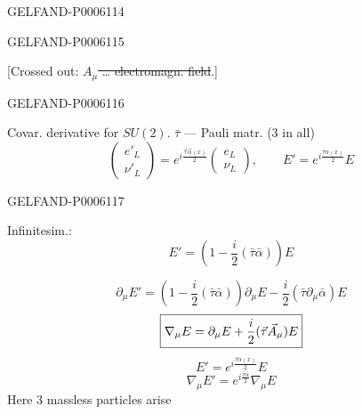 \begin{GelfandAdjacentEvidence}{GELFAND-P000611}{4}



\end{GelfandAdjacentEvidence}
\begin{GelfandAdjacentEvidence}{GELFAND-P000611}{5}


[Crossed out: \sout{\(A_\mu\) … electromagn. field}.]
\end{GelfandAdjacentEvidence}
\begin{GelfandAdjacentEvidence}{GELFAND-P000611}{6}


Covar. derivative for \(SU(2)\).
\qquad \(\bar\tau\) — Pauli matr. (3 in all)
\[
\begin{pmatrix}e'_L\\\nu'_L\end{pmatrix}
=e^{i\frac{\vec\tau\vec\alpha(x)}2}
\begin{pmatrix}e_L\\\nu_L\end{pmatrix},
\qquad E'=e^{i\frac{\bar\tau\bar\alpha(x)}2}E
\]
\end{GelfandAdjacentEvidence}
\begin{GelfandAdjacentEvidence}{GELFAND-P000611}{7}

Infinitesim.:
\[
E'=\left(1-\frac i2(\bar\tau\bar\alpha)\right)E
\]
\end{GelfandAdjacentEvidence}

\[
\partial_\mu E'=
\left(1-\frac i2(\bar\tau\bar\alpha)\right)\partial_\mu E
-\frac i2(\bar\tau\partial_\mu\bar\alpha)E
\]
\[
\fbox{$\displaystyle\nabla_\mu E
=\partial_\mu E+\frac i2(\vec\tau\vec A_\mu)E$}
\]
\[
E'=e^{i\frac{\bar\tau\bar\alpha(x)}2}E
\]
\[
\nabla_\mu E'=e^{i\frac{\bar\tau\bar\alpha}2}\nabla_\mu E
\]
Here 3 massless particles arise


